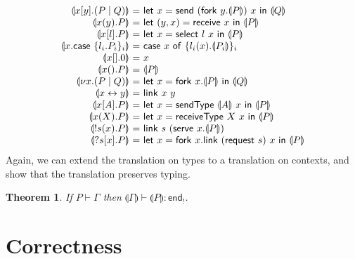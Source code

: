 \documentclass{easychair}
\makeatletter
\newtheorem{theorem}{Theorem}
\newcommand{\ba}{\begin{array}}
\newcommand{\ea}{\end{array}}
\newenvironment{eqs}{\ba{@{}r@{~}c@{~}l@{}}}{\ea}
\newcommand{\key}{\mathsf}
\newcommand{\set}[1]{\{ #1 \}}
\newcommand{\cptogv}[1]{\llparenthesis{#1}\rrparenthesis}
\newcommand{\row}[2]{\set{#1}_{#2}}
\newcommand{\gvEndOutput}{\key{end}_!}
\newcommand{\cpj}[2]{{#1} \vdash {#2}}
\newcommand{\gvj}[3]{{#1} \vdash {#2} : {#3}}
\newcommand{\la}{l}
\newcommand{\G}{\Gamma}
\newcommand{\gvLink}[2]{\key{link}~{#1}~{#2}}
\newcommand{\gvPair}[2]{({#1},{#2})}
\newcommand{\gvLet}[3]{\key{let}~{#1}={#2}~\key{in}~{#3}}
\newcommand{\gvSend}[2]{\key{send}~{#1}~{#2}}
\newcommand{\gvReceive}[1]{\key{receive}~{#1}}
\newcommand{\gvSelect}[2]{\key{select}~{#1}~{#2}}
\newcommand{\gvCase}[2]{\key{case}~{#1}~\key{of}~{#2}}
\newcommand{\gvFork}[2]{\key{fork}~{#1}.{#2}}
\newcommand{\gvTerminate}[1]{\key{terminate}~{#1}}
\newcommand{\gvSendType}[2]{\key{sendType}~{#1}~{#2}}
\newcommand{\gvReceiveType}[2]{\key{receiveType}~{#1}~{#2}}
\newcommand{\gvServe}[2]{\key{serve}~{#1}.{#2}}
\newcommand{\gvRequest}[1]{\key{request}~{#1}}
\newcommand{\cpLink}[2]{{#1} \leftrightarrow {#2}}
\newcommand{\cpCut}[3]{\nu {#1}.({#2} \mid {#3})}
\newcommand{\cpOutput}[4]{{#1}[{#2}].({#3} \mid {#4})}
\newcommand{\cpInput}[3]{{#1}({#2}).{#3}}
\newcommand{\cpInject}[3]{{#1}[{#2}].{#3}}
\newcommand{\cpCase}[2]{{#1}.\key{case}~{#2}}
\newcommand{\cpServe}[3]{!{#1}({#2}).{#3}}
\newcommand{\cpRequest}[3]{?{#1}[{#2}].{#3}}
\newcommand{\cpEmptyOut}[1]{{#1}[].0}
\newcommand{\cpEmptyIn}[2]{{#1}().{#2}}
\newcommand{\cpSendType}[3]{{#1}[{#2}].{#3}}
\newcommand{\cpReceiveType}[3]{{#1}({#2}).{#3}}
\makeatother
\begin{document}
\[
\begin{eqs}
\cptogv{\cpOutput{x}{y}{P}{Q}} &=&
  \gvLet{x}{\gvSend{(\gvFork{y}{\cptogv{P}})}{x}}{\cptogv{Q}} \\
\cptogv{\cpInput{x}{y}{P}} &=&
  \gvLet{\gvPair{y}{x}}{\gvReceive{x}}{\cptogv{P}} \\
\cptogv{\cpInject{x}{\la}{P}} &=&
  \gvLet{x}{\gvSelect{\la}{x}}{\cptogv{P}} \\
\cptogv{\cpCase{x}{\row{\la_i.P_i}{i}}} &=&
  \gvCase{x}{\row{\la_i(x).\cptogv{P_i}}{i}} \\
\cptogv{\cpEmptyOut{x}} &=& x \\
\cptogv{\cpEmptyIn{x}{P}} &=& \cptogv{P} \\
\cptogv{\cpCut{x}{P}{Q}} &=&
  \gvLet{x}{\gvFork{x}{\cptogv{P}}}{\cptogv{Q}} \\
\cptogv{\cpLink{x}{y}} &=& \gvLink{x}{y} \\

\cptogv{\cpSendType{x}{A}{P}} &=&
  \gvLet{x}{\gvSendType{\cptogv{A}}{x}}{\cptogv{P}} \\
\cptogv{\cpReceiveType{x}{X}{P}} &=&
  \gvLet{x}{\gvReceiveType{X}{x}}{\cptogv{P}} \\

\cptogv{\cpServe{s}{x}{P}} &=&
  \gvLink{s}{(\gvServe{x}{\cptogv{P}})} \\
\cptogv{\cpRequest{s}{x}{P}} &=&
  \gvLet{x}{\gvFork{x}{\gvLink{(\gvRequest{s})}{x}}}{\cptogv{P}} \\
\end{eqs}
\]
Again, we can extend the translation on types to a translation on contexts, and show that the
translation preserves typing.
\begin{theorem}
If $\cpj{P}{\G}$ then $\gvj{\cptogv{\G}}{\cptogv{P}}{\gvEndOutput}$.
\end{theorem}


\section{Correctness}
\label{sect:correctness}
\end{document}
